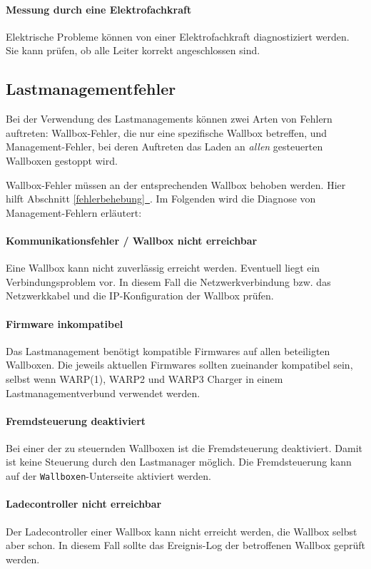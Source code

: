\documentclass[a4paper,10pt]{article}
\newcommand*{\fullref}[1]{Abschnitt \hyperref[{#1}]{\ref*{#1}~\nameref*{#1}}}
\begin{document}
\begin{multicols*}{2}
    \paragraph{Messung durch eine Elektrofachkraft} Elektrische Probleme können von
        einer Elektrofachkraft diagnostiziert werden. Sie kann prüfen, ob alle Leiter
        korrekt angeschlossen sind.

    \subsection{Lastmanagementfehler}
    Bei der Verwendung des Lastmanagements können zwei Arten von Fehlern auftreten: Wallbox-Fehler, die nur eine spezifische Wallbox betreffen, und Management-Fehler,
    bei deren Auftreten das Laden an \textit{allen} gesteuerten Wallboxen gestoppt wird.

    Wallbox-Fehler müssen an der entsprechenden Wallbox behoben werden. Hier
	hilft \fullref{fehlerbehebung}. Im Folgenden wird die Diagnose von Management-Fehlern erläutert:

    \paragraph{Kommunikationsfehler / Wallbox nicht erreichbar}
    Eine Wallbox kann nicht zuverlässig erreicht werden. Eventuell liegt ein
	Verbindungsproblem vor. In diesem Fall die Netzwerkverbindung bzw. das
	Netzwerkkabel und die IP-Konfiguration der Wallbox prüfen.

    \paragraph{Firmware inkompatibel}
    Das Lastmanagement benötigt kompatible Firmwares auf allen beteiligten Wallboxen. Die jeweils aktuellen Firmwares sollten zueinander kompatibel sein,
    selbst wenn WARP(1), WARP2 und WARP3 Charger in einem Lastmanagementverbund verwendet werden.

    \paragraph{Fremdsteuerung deaktiviert}
    Bei einer der zu steuernden Wallboxen ist die Fremdsteuerung deaktiviert. Damit ist keine Steuerung durch den Lastmanager möglich. Die Fremdsteuerung kann auf der \texttt{Wallboxen}-Unterseite aktiviert werden.

    \paragraph{Ladecontroller nicht erreichbar}
    Der Ladecontroller einer Wallbox kann nicht erreicht werden, die Wallbox
	selbst aber schon. In diesem Fall sollte das Ereignis-Log der betroffenen
	Wallbox geprüft werden.


\end{multicols*}
\end{document}
